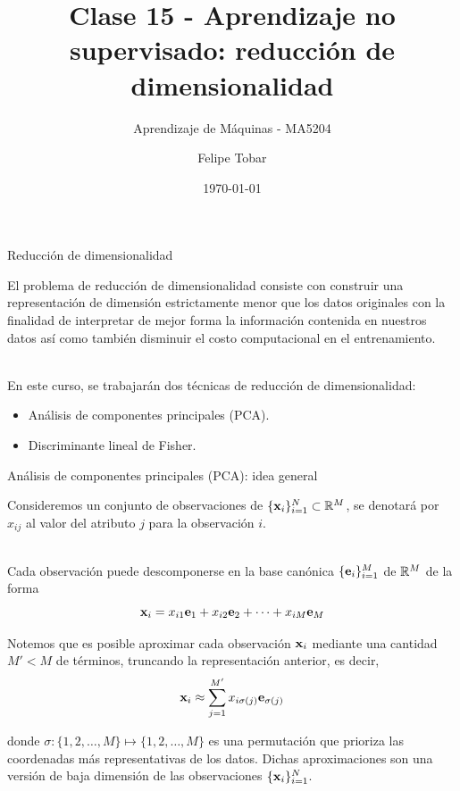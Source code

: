 \documentclass[9pt]{beamer}
\title{Clase 15 - Aprendizaje no supervisado: reducción de dimensionalidad}
\subtitle{Aprendizaje de Máquinas - MA5204}
\date{\today}
\author{Felipe Tobar}
\institute{Department of Mathematical Engineering \&\\ Center for Mathematical Modelling\\Universidad de Chile}
\begin{document}
\begin{frame}
  \titlepage
\end{frame}

\begin{frame}{Reducción de dimensionalidad}

El problema de reducción de dimensionalidad consiste con construir una representación de dimensión estrictamente menor que los datos originales con la finalidad de interpretar de mejor forma la información contenida en nuestros datos así como también disminuir el costo computacional en el entrenamiento.\\~\ \pause

En este curso, se trabajarán dos técnicas de reducción de dimensionalidad:

\begin{itemize}
	\item Análisis de componentes principales (PCA).
	\item Discriminante lineal de Fisher.
\end{itemize}
	
\end{frame}

\begin{frame}{Análisis de componentes principales (PCA): idea general}

Consideremos un conjunto de observaciones de $\{\mathbf{x}_i\}_{i=1}^N\subset\mathbb{R}^M$, se denotará por $x_{ij}$ al valor del atributo $j$ para la observación $i$. \\~\ \pause

Cada observación puede descomponerse en la base canónica $\{\mathbf{e}_i\}_{i=1}^M$ de $\mathbb{R}^M$ de la forma 
\begin{equation*}
	\mathbf{x}_i = x_{i1}\mathbf{e}_1 +  x_{i2}\mathbf{e}_2 + \cdots + x_{iM}\mathbf{e}_M 		
\end{equation*}\pause

Notemos que es posible aproximar cada observación $\mathbf{x}_i$ mediante una cantidad $M'<M$ de términos, truncando la representación anterior, es decir,  
\begin{equation*}
	\mathbf{x}_i \approx \sum_{j=1}^{M'} x_{i\sigma(j)}\mathbf{e}_{\sigma(j)}
\end{equation*}

donde $\sigma:\{1,2,\ldots,M\}\mapsto\{1,2,\ldots,M\}$ es una permutación que prioriza las coordenadas más representativas de los datos. Dichas aproximaciones son una versión de baja dimensión de las observaciones $\{\mathbf{x}_i\}_{i=1}^N$.\\~\ 
\end{frame}
\end{document}
